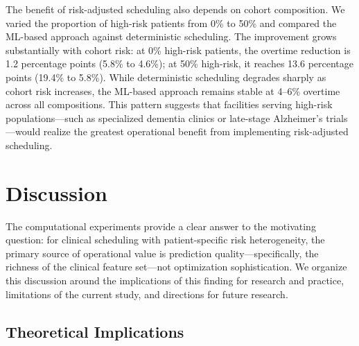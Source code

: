 \documentclass[11pt,a4paper]{article}
\begin{document}
The benefit of risk-adjusted scheduling also depends on cohort composition. We varied the proportion of high-risk patients from 0\% to 50\% and compared the ML-based approach against deterministic scheduling. The improvement grows substantially with cohort risk: at 0\% high-risk patients, the overtime reduction is 1.2 percentage points (5.8\% to 4.6\%); at 50\% high-risk, it reaches 13.6 percentage points (19.4\% to 5.8\%). While deterministic scheduling degrades sharply as cohort risk increases, the ML-based approach remains stable at 4--6\% overtime across all compositions. This pattern suggests that facilities serving high-risk populations---such as specialized dementia clinics or late-stage Alzheimer's trials---would realize the greatest operational benefit from implementing risk-adjusted scheduling.



\section{Discussion}
\label{sec:discussion}

The computational experiments provide a clear answer to the motivating question: for clinical scheduling with patient-specific risk heterogeneity, the primary source of operational value is prediction quality---specifically, the richness of the clinical feature set---not optimization sophistication. We organize this discussion around the implications of this finding for research and practice, limitations of the current study, and directions for future research.

\subsection{Theoretical Implications}
\end{document}
